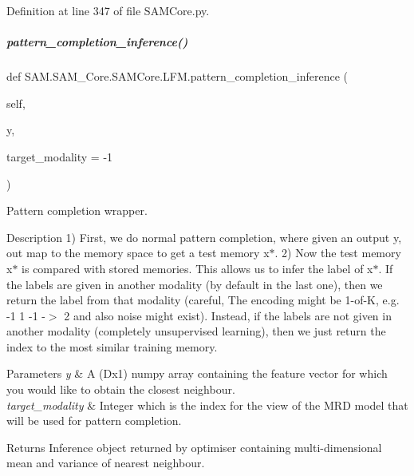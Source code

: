 Definition at line 347 of file S\+A\+M\+Core.\+py.

\mbox{\label{group__icubclient__SAM__Core_ac7a83c12364fdedd0786cbbfa370d913}} 
\subparagraph{\texorpdfstring{pattern\+\_\+completion\+\_\+inference()}{pattern\_completion\_inference()}}
{\footnotesize\ttfamily def S\+A\+M.\+S\+A\+M\+\_\+\+Core.\+S\+A\+M\+Core.\+L\+F\+M.\+pattern\+\_\+completion\+\_\+inference (\begin{DoxyParamCaption}\item[{}]{self,  }\item[{}]{y,  }\item[{}]{target\+\_\+modality = {\ttfamily -\/1} }\end{DoxyParamCaption})}



Pattern completion wrapper. 

\begin{DoxyParagraph}{Description}
1) First, we do normal pattern completion, where given an output y, out map to the memory space to get a test memory x$\ast$. 2) Now the test memory x$\ast$ is compared with stored memories. This allows us to infer the label of x$\ast$. If the labels are given in another modality (by default in the last one), then we return the label from that modality (careful, The encoding might be 1-\/of-\/K, e.\+g. -\/1 1 -\/1 -\/$>$ 2 and also noise might exist). Instead, if the labels are not given in another modality (completely unsupervised learning), then we just return the index to the most similar training memory.
\end{DoxyParagraph}

\begin{DoxyParams}{Parameters}
{\em y} & A {\ttfamily (Dx1)} numpy array containing the feature vector for which you would like to obtain the closest neighbour. \\
\hline
{\em target\+\_\+modality} & Integer which is the index for the view of the M\+RD model that will be used for pattern completion.\\
\hline
\end{DoxyParams}
\begin{DoxyReturn}{Returns}
Inference object returned by optimiser containing multi-\/dimensional mean and variance of nearest neighbour. 
\end{DoxyReturn}


